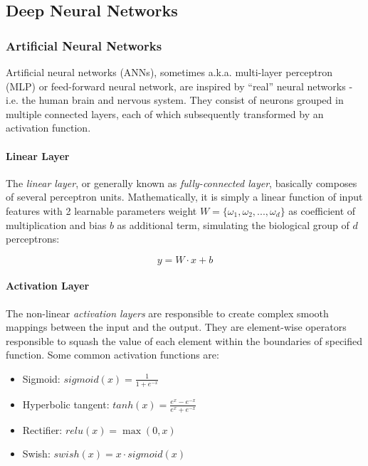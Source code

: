 
\subsection{Deep Neural Networks}
    \subsubsection{Artificial Neural Networks}
        Artificial neural networks (ANNs), sometimes a.k.a. multi-layer perceptron (MLP) or feed-forward neural network, are inspired by ``real'' neural networks - i.e. the human brain and nervous system.
        They consist of neurons grouped in multiple connected layers, each of which subsequently transformed by an activation function.

        \paragraph{Linear Layer}
            The \textit{linear layer}, or generally known as \textit{fully-connected layer}, basically composes of several perceptron units.
            Mathematically, it is simply a linear function of input features with 2 learnable parameters weight $W = \{\omega_1,\omega_2,...,\omega_d\}$ as coefficient of multiplication and bias $b$ as additional term, simulating the biological group of $d$ perceptrons:

            \begin{equation}
                y = W \cdot x + b
            \end{equation}

        \paragraph{Activation Layer}
            The non-linear \textit{activation layers} are responsible to create complex smooth mappings between the input and the output.
            They are element-wise operators responsible to squash the value of each element within the boundaries of specified function.
            Some common activation functions are:

            \begin{itemize}
                \item Sigmoid: $sigmoid\left(x\right) = \frac{1}{1 + e^{-x}}$
                \item Hyperbolic tangent: $tanh\left(x\right) = \frac{e^{x} - e^{-x}}{e^{x} + e^{-x}}$
                \item Rectifier: $relu\left(x\right) = \max\left(0, x\right)$
                \item Swish: $swish\left(x\right) = x \cdot sigmoid\left(x\right)$
            \end{itemize}

